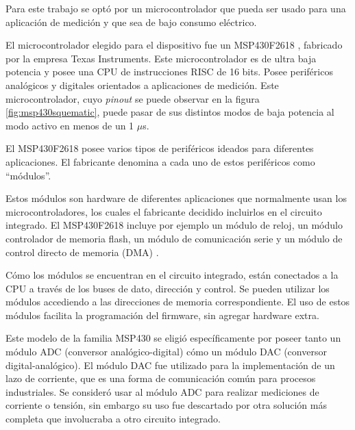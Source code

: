 Para este trabajo se optó por un microcontrolador que pueda ser usado para una aplicación de medición y que sea de bajo consumo eléctrico. 


El microcontrolador elegido para el dispositivo fue un MSP430F2618 \cite{msp430freff}, fabricado por la empresa Texas Instruments. Este microcontrolador es de ultra baja potencia y posee una CPU de instrucciones RISC de 16 bits. Posee periféricos analógicos y digitales orientados a aplicaciones de medición. Este microcontrolador, cuyo \textit{pinout} se puede observar en la figura \ref{fig:msp430squematic}, puede pasar de sus distintos modos de baja potencia al modo activo en menos de un 1 $\mu$s.



El MSP430F2618 posee varios tipos de periféricos ideados para diferentes aplicaciones. El fabricante denomina a cada uno de estos periféricos como \textquotedblleft módulos\textquotedblright .
 
Estos módulos son hardware de diferentes aplicaciones que normalmente usan los microcontroladores, los cuales el fabricante decidido incluirlos en el circuito integrado. El MSP430F2618 incluye por ejemplo un módulo de reloj, un módulo controlador de memoria flash, un módulo de comunicación serie y un módulo de control directo de memoria (DMA) \cite{msp430slau144j}. 

Cómo los módulos se encuentran en el circuito integrado, están conectados a la CPU a través de los buses de dato, dirección y control. Se pueden utilizar los módulos accediendo a las direcciones de memoria correspondiente. El uso de estos módulos facilita la programación del firmware, sin agregar hardware extra.

 



Este modelo de la familia MSP430 se eligió específicamente por poseer tanto un módulo ADC (conversor analógico-digital) cómo un módulo DAC (conversor digital-analógico). El módulo DAC fue utilizado para la implementación de un lazo de corriente, que es una forma de comunicación común para procesos industriales. Se consideró usar al módulo ADC para realizar mediciones de corriente o tensión, sin embargo su uso fue descartado por otra solución más completa que involucraba a otro circuito integrado.

